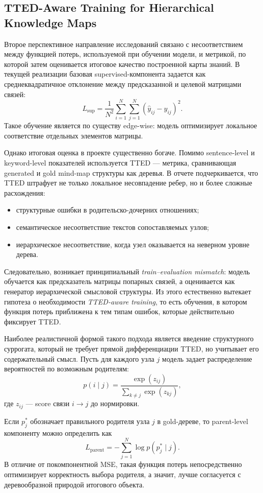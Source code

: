 \documentclass[12pt,a4paper]{article}
\begin{document}
\subsection{TTED-Aware Training for Hierarchical Knowledge Maps}

Второе перспективное направление исследований связано с несоответствием между функцией потерь, используемой при обучении модели, и метрикой, по которой затем оценивается итоговое качество построенной карты знаний. В текущей реализации базовая supervised-компонента задается как среднеквадратичное отклонение между предсказанной и целевой матрицами связей:
\[
L_{\mathrm{sup}}
=
\frac{1}{N^2}
\sum_{i=1}^{N}\sum_{j=1}^{N}
(\hat{y}_{ij} - y_{ij})^2.
\]
Такое обучение является по существу edge-wise: модель оптимизирует локальное соответствие отдельных элементов матрицы.

Однако итоговая оценка в проекте существенно богаче. Помимо sentence-level и keyword-level показателей используется TTED --- метрика, сравнивающая generated и gold mind-map структуры как деревья. В отчете подчеркивается, что TTED штрафует не только локальное несовпадение ребер, но и более сложные расхождения:
\begin{itemize}
    \item структурные ошибки в родительско-дочерних отношениях;
    \item семантическое несоответствие текстов сопоставляемых узлов;
    \item иерархическое несоответствие, когда узел оказывается на неверном уровне дерева.
\end{itemize}

Следовательно, возникает принципиальный \emph{train--evaluation mismatch}: модель обучается как предсказатель матрицы попарных связей, а оценивается как генератор иерархической смысловой структуры. Из этого естественно вытекает гипотеза о необходимости \emph{TTED-aware training}, то есть обучения, в котором функция потерь приближена к тем типам ошибок, которые действительно фиксирует TTED.

Наиболее реалистичной формой такого подхода является введение структурного суррогата, который не требует прямой дифференциации TTED, но учитывает его содержательный смысл. Пусть для каждого узла $j$ модель задает распределение вероятностей по возможным родителям:
\[
p(i \mid j)
=
\frac{\exp(z_{ij})}{\sum_{k \ne j}\exp(z_{kj})},
\]
где $z_{ij}$ --- score связи $i \rightarrow j$ до нормировки.

Если $p_j^\ast$ обозначает правильного родителя узла $j$ в gold-дереве, то parent-level компоненту можно определить как
\[
L_{\mathrm{parent}}
=
-\sum_{j=1}^{N}
\log p(p_j^\ast \mid j).
\]
В отличие от покомпонентной MSE, такая функция потерь непосредственно оптимизирует корректность выбора родителя, а значит, лучше согласуется с деревообразной природой итогового объекта.
\end{document}
